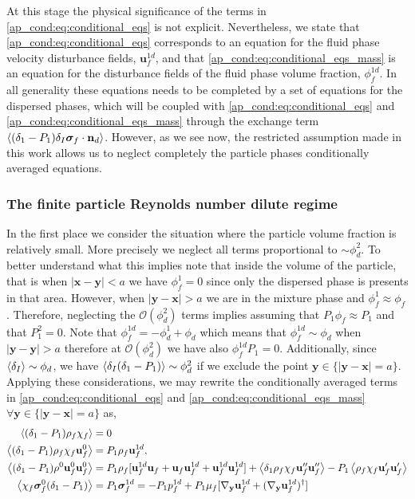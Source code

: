 At this stage the physical significance of the terms in \ref{ap_cond:eq:conditional_eqs} is not explicit. 
Nevertheless, we state that \ref{ap_cond:eq:conditional_eqs} corresponds to an equation for the fluid phase velocity disturbance fields, $\textbf{u}_f^{1d}$, and that \ref{ap_cond:eq:conditional_eqs_mass} is an equation for the disturbance fields of the fluid phase volume fraction, $\phi_f^{1d}$. 
In all generality these equations needs to be completed by a set of equations for the dispersed phases, which will be coupled with \ref{ap_cond:eq:conditional_eqs} and \ref{ap_cond:eq:conditional_eqs_mass} through the exchange term $\left<(\delta_1 - P_1)\delta_I \bm\sigma_f \cdot \textbf{n}_d\right>$. 
However, as we see now, the restricted assumption made in this work allows us to neglect completely the particle phases conditionally averaged equations. 



\subsubsection{The finite particle Reynolds number dilute regime}
In the first place we consider the situation where the particle volume fraction is relatively small. 
More precisely we neglect all terms proportional to $\sim \phi_d^2$. 
To better understand what this implies note that inside the volume of the particle, that is when $|\textbf{x}-\textbf{y}| < a$ we have $\phi_f^1 = 0$ since only the dispersed phase is presents in that area. 
However, when $|\textbf{y} - \textbf{x}| >a$ we are in the mixture phase and $\phi_f^1 \approx \phi_f$.
Therefore, neglecting the $\mathcal{O}(\phi_d^2)$ terms  implies assuming that $P_1 \phi_f \approx P_1$ and that $P_1^2 = 0$. 
Note that $\phi_f^{1d} = -\phi_d^1 + \phi_d$ which means that $\phi_f^{1d} \sim \phi_d$ when $|\textbf{y} -\textbf{y}| > a$ therefore at  $\mathcal{O}(\phi_d^2)$ we have also $\phi_f^{1d} P_1= 0$. 
Additionally, since $\left<\delta_I\right>\sim \phi_d$, we have $\left<\delta_I(\delta_1-P_1)\right>\sim \phi_d^2$ if we exclude the point $\textbf{y}\in \{|\textbf{y}-\textbf{x}| = a\}$. 
Applying these considerations, we may rewrite the conditionally averaged terms in \ref{ap_cond:eq:conditional_eqs} and \ref{ap_cond:eq:conditional_eqs_mass}  $\forall \textbf{y}\in \{|\textbf{y}-\textbf{x}| = a\}$ as, 
\begin{align*}
    \left<(\delta_1 - P_1)\rho_f\chi_f\right>
    &=0 \\ 
    \left<(\delta_1 - P_1)\rho_f\chi_f\textbf{u}^0_f\right>
    &= P_1 \rho_f \textbf{u}_f^{1d},\\
    \left<(\delta_1 - P_1)\rho^0\textbf{u}^0_f\textbf{u}^0_f\right>
    &=
    P_1\rho_f[
        \textbf{u}^{1d}_f\textbf{u}_f
        + \textbf{u}_f\textbf{u}_f^{1d}
        + \textbf{u}^{1d}_f\textbf{u}_f^{1d}
    ]
    + \left<\delta_1\rho_f\chi_f\textbf{u}_f''\textbf{u}_f''\right>
    - P_1 \left<\rho_f\chi_f\textbf{u}_f'\textbf{u}_f'\right>\\
    \left<\chi_f \bm\sigma^0_f(\delta_1 - P_1)\right> 
    &= 
    P_1 \bm\sigma^{1d}_f 
    = 
    -P_1  p_f^{1d} 
    +P_1 \mu_f [{\mathbf{\nabla}_\textbf{y}} \textbf{u}_f^{1d}+({\mathbf{\nabla}_\textbf{y}} \textbf{u}_f^{1d})^\dagger ]
\end{align*}

